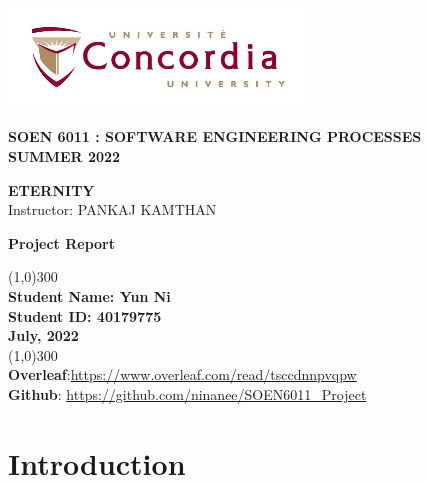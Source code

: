 \documentclass[11pt]{article}
\begin{document}
\begin{titlepage}
\begin{center}
    \includegraphics[width=8cm]{images/logo.jpg}
\end{center}

\begin{center}
\begin{Large}
\textbf{SOEN 6011 : SOFTWARE ENGINEERING PROCESSES} \\
\vspace*{0.1in}
\textbf{SUMMER 2022}\\
\vspace*{0.9in}
\end{Large}
\begin{Large}
\textbf{ETERNITY}\\
\vspace*{0.1in}
Instructor: PANKAJ KAMTHAN \\
\vspace*{0.9in}
\begin{Huge}
\textbf{Project Report}\\
\vspace*{0.9in}
\end{Huge}
\end{Large}

\begin{center}
    \line(1,0){300}\\
    \textbf{Student Name: Yun Ni\\
    Student ID: 40179775}\\
    \textbf{July, 2022}\\
    \line(1,0){300}\\
    \vspace*{0.5in}
    \textbf{Overleaf}:\url{https://www.overleaf.com/read/tsccdnnpvqpw} \\
    \textbf{Github}: \url{https://github.com/ninanee/SOEN6011_Project} 
\end{center}
\end{center}

\end{titlepage}
\newpage
\tableofcontents

\newpage
\section{Introduction}\label{problem1}
\end{document}
